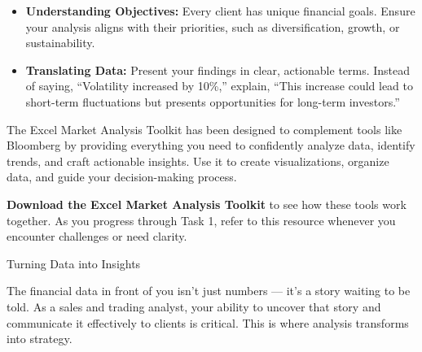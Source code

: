 \documentclass[11pt]{article}
\begin{document}
\begin{itemize}[leftmargin=1.5em, itemsep=2pt]
  \item \textbf{Understanding Objectives:} Every client has unique financial
  goals. Ensure your analysis aligns with their priorities, such as
  diversification, growth, or sustainability.
  \item \textbf{Translating Data:} Present your findings in clear, actionable
  terms. Instead of saying, ``Volatility increased by 10\%,'' explain, ``This
  increase could lead to short-term fluctuations but presents opportunities
  for long-term investors.''
\end{itemize}


The Excel Market Analysis Toolkit has been designed to complement tools like
Bloomberg by providing everything you need to confidently analyze data,
identify trends, and craft actionable insights. Use it to create
visualizations, organize data, and guide your decision-making process.

\textbf{Download the Excel Market Analysis Toolkit} to see how these tools work
together. As you progress through Task 1, refer to this resource whenever you
encounter challenges or need clarity.\par\medskip


\newpage
{\fontsize{26}{30}\selectfont Turning Data into Insights}\par\bigskip

The financial data in front of you isn't just numbers --- it's a story waiting
to be told. As a sales and trading analyst, your ability to uncover that story
and communicate it effectively to clients is critical. This is where analysis
transforms into strategy.

\end{document}

